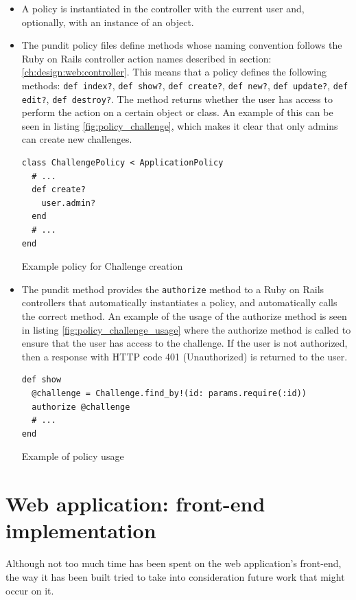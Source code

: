 \begin{itemize}
    \item A policy is instantiated in the controller with the current user and, optionally, with an instance of an object.
    \item The pundit policy files define methods whose naming convention follows the Ruby on Rails controller action names described in section: \ref{ch:design:web:controller}. This means that a policy defines the following methods: \texttt{def index?}, \texttt{def show?}, \texttt{def create?}, \texttt{def new?}, \texttt{def update?}, \texttt{def edit?}, \texttt{def destroy?}. The method returns whether the user has access to perform the action on a certain object or class. An example of this can be seen in listing \ref{fig:policy_challenge}, which makes it clear that only admins can create new challenges.

\begin{code}
\begin{verbatim}
class ChallengePolicy < ApplicationPolicy
  # ...
  def create?
    user.admin?
  end
  # ...
end
\end{verbatim}
\caption{Example policy for Challenge creation}
\label{fig:policy_challenge}
\end{code}
    \item The pundit method provides the \texttt{authorize} method to a Ruby on Rails controllers that automatically instantiates a policy, and automatically calls the correct method. An example of the usage of the authorize method is seen in listing \ref{fig:policy_challenge_usage} where the authorize method is called to ensure that the user has access to the challenge. If the user is not authorized, then a response with HTTP code 401 (Unauthorized) is returned to the user.
\begin{code}
\begin{verbatim}
def show
  @challenge = Challenge.find_by!(id: params.require(:id))
  authorize @challenge
  # ...
end
\end{verbatim}
\caption{Example of policy usage}
\label{fig:policy_challenge_usage}
\end{code}
\end{itemize}

\section{Web application: front-end implementation}
Although not too much time has been spent on the web application's front-end, the way it has been built tried to take into consideration future work that might occur on it. 


